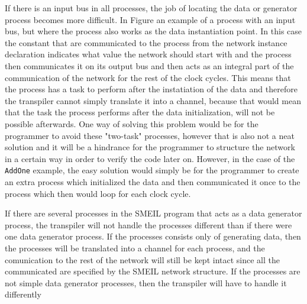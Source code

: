 If there is an input bus in all processes, the job of locating the data or generator process becomes more difficult. In Figure %
an example of a process with an input bus, but where the process also works as the data instantiation point. In this case the constant that are communicated to the process from the network instance declaration indicates what value the network should start with and the process then communicates it on its output bus and then acts as an integral part of the communication of the network for the rest of the clock cycles. This means that the process has a task to perform after the instatiation of the data and therefore the transpiler cannot simply translate it into a \cspm channel, because that would mean that the task the process performs after the data initialization, will not be possible afterwards. One way of solving this problem would be for the programmer to avoid these "two-task" processes, however that is also not a neat solution and it will be a hindrance for the programmer to structure the network in a certain way in order to verify the code later on. However, in the case of the \texttt{AddOne} example, the easy solution would simply be for the programmer to create an extra process which initialized the data and then communicated it once to the process which then would loop for each clock cycle.

If there are several processes in the SMEIL program that acts as a data generator process, the transpiler will not handle the processes different than if there were one data generator process. If the processes consists only of generating data, then the processes will be translated into a \cspm channel for each process, and the comunication to the rest of the network will still be kept intact since all the communicated are specified by the SMEIL network structure.
If the processes are not simple data generator processes, then the transpiler will have to handle it differently %


